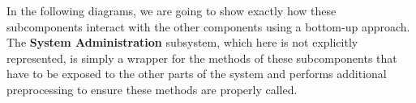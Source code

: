 In the following diagrams, we are going to show exactly how these subcomponents interact with the other components using a bottom-up approach. The \textbf{System Administration} subsystem, which here is not explicitly represented, is simply a wrapper for the methods of these subcomponents that have to be exposed to the other parts of the system and performs additional preprocessing to ensure these methods are properly called. 
\begin{figure}[H]
\centering
{}
\end{figure}
\begin{figure}[H]
\centering
{}
\end{figure}
\begin{figure}[H]
\centering
{}
\end{figure}
\begin{figure}[H]
\centering
{}
\end{figure}
\begin{figure}[H]
\centering
{}
\end{figure}
